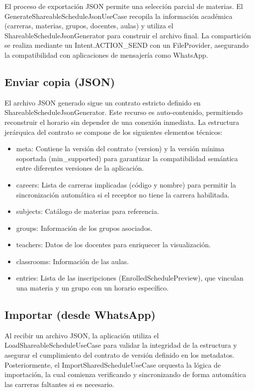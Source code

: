 El proceso de exportación JSON permite una selección parcial de materias. El GenerateShareableScheduleJsonUseCase recopila la información académica (carreras, materias, grupos, docentes, aulas) y utiliza el ShareableScheduleJsonGenerator para construir el archivo final. La compartición se realiza mediante un Intent.ACTION\_SEND con un FileProvider, asegurando la compatibilidad con aplicaciones de mensajería como WhatsApp.

\subsection{Enviar copia (JSON)}
El archivo JSON generado sigue un contrato estricto definido en ShareableScheduleJsonGenerator. Este recurso es auto-contenido, permitiendo reconstruir el horario sin depender de una conexión inmediata. La estructura jerárquica del contrato se compone de los siguientes elementos técnicos:

\begin{itemize}
  \item meta: Contiene la versión del contrato (version) y la versión mínima soportada (min\_supported) para garantizar la compatibilidad semántica entre diferentes versiones de la aplicación.
  \item careers: Lista de carreras implicadas (código y nombre) para permitir la sincronización automática si el receptor no tiene la carrera habilitada.
  \item subjects: Catálogo de materias para referencia.
  \item groups: Información de los grupos asociados.
  \item teachers: Datos de los docentes para enriquecer la visualización.
  \item classrooms: Información de las aulas.
  \item entries: Lista de las inscripciones (EnrolledSchedulePreview), que vinculan una materia y un grupo con un horario específico.
\end{itemize}

\subsection{Importar (desde WhatsApp)}
Al recibir un archivo JSON, la aplicación utiliza el LoadShareableScheduleUseCase para validar la integridad de la estructura y asegurar el cumplimiento del contrato de versión definido en los metadatos. Posteriormente, el ImportSharedScheduleUseCase orquesta la lógica de importación, la cual comienza verificando y sincronizando de forma automática las carreras faltantes si es necesario.

